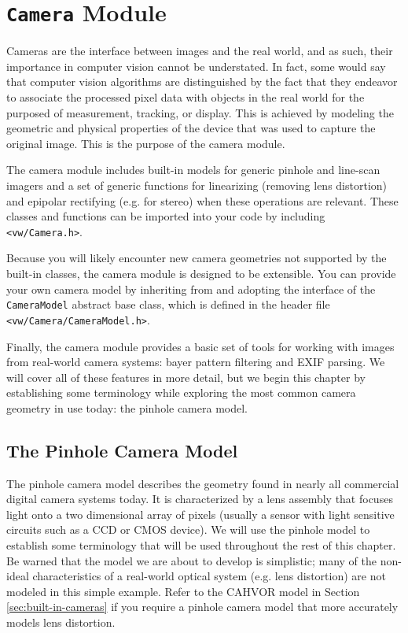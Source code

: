 \chapter{{\tt Camera} Module}\label{ch:camera-module}

Cameras are the interface between images and the real world, and as
such, their importance in computer vision cannot be understated.  In
fact, some would say that computer vision algorithms are distinguished
by the fact that they endeavor to associate the processed pixel data
with objects in the real world for the purposed of measurement,
tracking, or display.  This is achieved by modeling the geometric and
physical properties of the device that was used to capture the
original image.  This is the purpose of the camera module.

The camera module includes built-in models for generic pinhole and
line-scan imagers and a set of generic functions for linearizing
(removing lens distortion) and epipolar rectifying (e.g. for stereo)
when these operations are relevant.  These classes and functions can
be imported into your code by including {\tt <vw/Camera.h>}.

Because you will likely encounter new camera geometries not supported
by the built-in classes, the camera module is designed to be
extensible.  You can provide your own camera model by inheriting
from and adopting the interface of the {\tt CameraModel} abstract base
class, which is defined in the header file {\tt <vw/Camera/CameraModel.h>}.

Finally, the camera module provides a basic set of tools for working
with images from real-world camera systems: bayer pattern filtering
and EXIF parsing.  We will cover all of these features in more detail,
but we begin this chapter by establishing some terminology while
exploring the most common camera geometry in use today: the pinhole
camera model.

\section{The Pinhole Camera Model}
The pinhole camera model describes the geometry found in nearly all
commercial digital camera systems today.  It is characterized by a
lens assembly that focuses light onto a two dimensional array of
pixels (usually a sensor with light sensitive circuits such as a CCD
or CMOS device).  We will use the pinhole model to establish some
terminology that will be used throughout the rest of this chapter.  Be
warned that the model we are about to develop is simplistic; many of
the non-ideal characteristics of a real-world optical system
(e.g. lens distortion) are not modeled in this simple example.  Refer
to the CAHVOR model in Section \ref{sec:built-in-cameras} if you
require a pinhole camera model that more accurately models lens
distortion.

